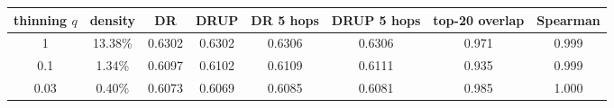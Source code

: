 \begin{tabular}{cccccccc}
\toprule
thinning $q$ & density & DR & DRUP & DR 5 hops & DRUP 5 hops & top-20 overlap & Spearman\\
\midrule
1 & 13.38\% & 0.6302 & 0.6302 & 0.6306 & 0.6306 & 0.971 & 0.999\\
0.1 & 1.34\% & 0.6097 & 0.6102 & 0.6109 & 0.6111 & 0.935 & 0.999\\
0.03 & 0.40\% & 0.6073 & 0.6069 & 0.6085 & 0.6081 & 0.985 & 1.000\\
\bottomrule
\end{tabular}
